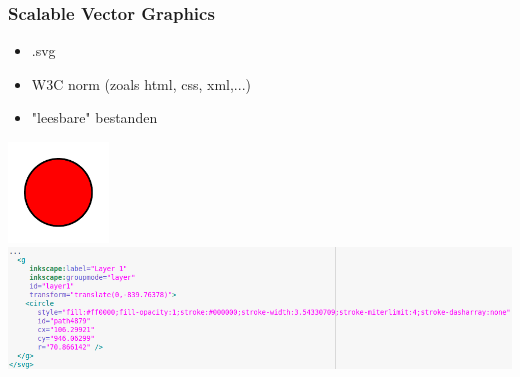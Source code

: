 \documentclass[t]{beamer}
\begin{document}
	\begin{frame}
		\frametitle{Scalable Vector Graphics}
		\begin{itemize}
			\item .svg
			\item W3C norm (zoals html, css, xml,...)
			\item "leesbare" bestanden
		\end{itemize}
		\vspace{0.5cm}
		\begin{center}
			\hfill \includegraphics[width=0.2\textwidth]{fig/simpele_tekening}\\
			\vspace{-0.2cm}
			\includegraphics[width=\textwidth]{fig/simpele_tekening_bron.png}
		\end{center}	
	\end{frame}
\end{document}
